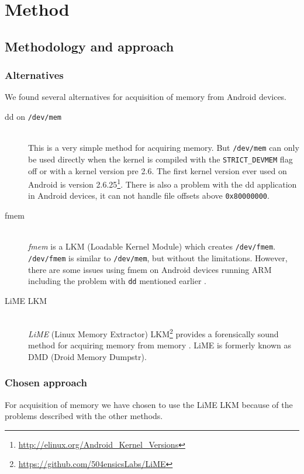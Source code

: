 \section{Method}
\subsection{Methodology and approach}
\subsubsection{Alternatives}\label{lime}
  We found several alternatives for acquisition of memory from Android devices.
  \begin{description}
      \item[dd on \texttt{/dev/mem}] \hfill \\
          This is a very simple method for acquiring memory. But \texttt{/dev/mem} can only be used directly when the kernel is 
          compiled with the \texttt{STRICT\_DEVMEM} flag off or with a kernel version pre 2.6. The first kernel version ever used on 
      Android is version 2.6.25\footnote{\url{http://elinux.org/Android\_Kernel\_Versions}}. There is also a problem with 
      the dd application in Android devices, it can not handle file offsets above \texttt{0x80000000}\cite{acq_vol_android_mem}.
    \item[fmem] \hfill \\
        \textit{fmem} is a LKM (Loadable Kernel Module) which creates \texttt{/dev/fmem}. \texttt{/dev/fmem} is similar to 
        \texttt{/dev/mem}, but without the limitations. 
        However, there are some issues using fmem on Android devices running ARM including the problem with \texttt{dd} 
        mentioned earlier \cite{acq_vol_android_mem}.
    \item[LiME LKM] \hfill \\
        \textit{LiME} (Linux Memory Extractor) LKM\footnote{\url{https://github.com/504ensicsLabs/LiME}} 
        provides a forensically sound method for acquiring memory from 
        memory \cite{heriyanto2013procedures}. LiME is formerly known as DMD (Droid Memory Dumpstr).
  \end{description}
  \subsubsection{Chosen approach}
  For acquisition of memory we have chosen to use the LiME LKM because of the problems described with the other methods.

